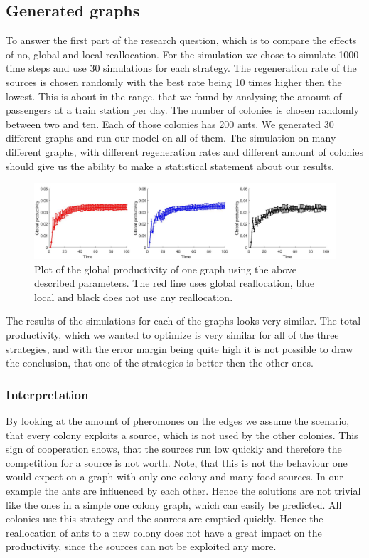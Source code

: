 \subsection{Generated graphs} \label{results1}
To answer the first part of the research question, which is to compare the effects of no, global and local reallocation. For the simulation we chose to simulate 1000 time steps and use 30 simulations for each strategy. The regeneration rate of the sources is chosen randomly with the best rate being 10 times higher then the lowest. This is about in the range, that we found by analysing the amount of passengers at a train station per day. The number of colonies is chosen randomly between two and ten. Each of those colonies has 200 ants. We generated 30 different graphs and run our model on all of them. The simulation on many different graphs, with different regeneration rates and different amount of colonies should give us the ability to make a statistical statement about our results.

\begin{figure}[H]
	\centering
	\includegraphics[scale=0.5]{globalProductivity.pdf}
	\caption{Plot of the global productivity of one graph using the above described parameters. The red line uses global reallocation, blue local and black does not use any reallocation.}
\end{figure}
The results of the simulations for each of the graphs looks very similar. The total productivity, which we wanted to optimize is very similar for all of the three strategies, and with the error margin being quite high it is not possible to draw the conclusion, that one of the strategies is better then the other ones. 
\subsubsection{Interpretation}
By looking at the amount of pheromones on the edges we assume the scenario, that every colony exploits a source, which is not used by the other colonies. This sign of cooperation shows, that the sources run low quickly and therefore the competition for a source is not worth. Note, that this is not the behaviour one would expect on a graph with only one colony and many food sources. In our example the ants are influenced by each other. Hence the solutions are not trivial like the ones in a simple one colony graph, which can easily be predicted. All colonies use this strategy and the sources are emptied quickly. Hence the reallocation of ants to a new colony does not have a great impact on the productivity, since the sources can not be exploited any more. 

